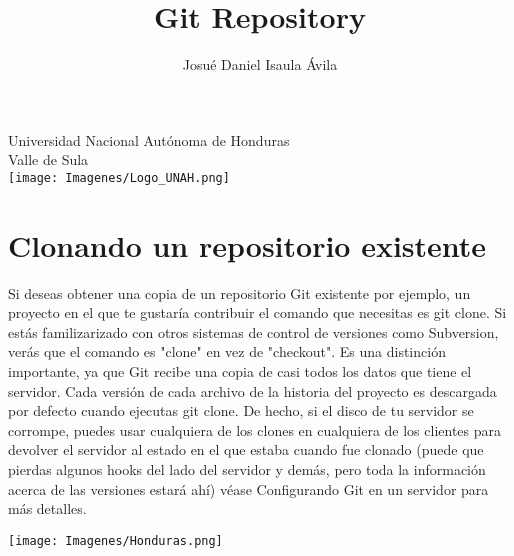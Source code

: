 \documentclass[12pt,a4paper]{article}
\author{Josué Daniel Isaula Ávila}
\title{Git Repository}
\begin{document}
\maketitle 

\begin{center}
    \huge Universidad Nacional Autónoma de Honduras \\ 
    \large Valle de Sula \\
    \vspace{5 mm}
    \texttt{[image: Imagenes/Logo\_UNAH.png]}
\end{center}
\newpage

\section{Clonando un repositorio existente}
Si deseas obtener una copia de un repositorio Git existente por ejemplo, un
proyecto en el que te gustaría contribuir el comando que necesitas es git clone. Si
estás familizarizado con otros sistemas de control de versiones como Subversion, verás
que el comando es "clone" en vez de "checkout". Es una distinción importante, ya que
Git recibe una copia de casi todos los datos que tiene el servidor. Cada versión de
cada archivo de la historia del proyecto es descargada por defecto cuando ejecutas git
clone. De hecho, si el disco de tu servidor se corrompe, puedes usar cualquiera de los
clones en cualquiera de los clientes para devolver el servidor al estado en el que
estaba cuando fue clonado (puede que pierdas algunos hooks del lado del servidor y
demás, pero toda la información acerca de las versiones estará ahí) véase
Configurando Git en un servidor para más detalles. \vspace{0.5 cm}

\centering 
\texttt{[image: Imagenes/Honduras.png]}
\end{document}
